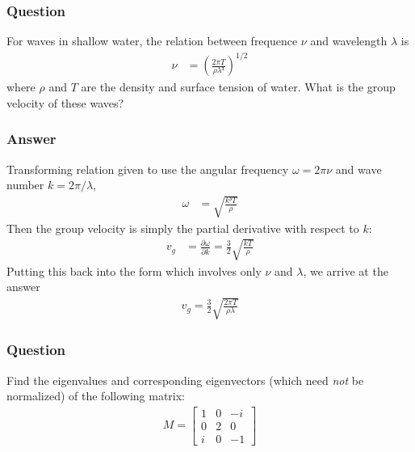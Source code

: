 \subsubsection{Question}

For waves in shallow water, the relation between frequence $ν$ and wavelength
$λ$ is
\begin{align*}
    ν &= (\frac{2πT}{ρλ³})^{1/2}
\end{align*}
where $ρ$ and $T$ are the density and surface tension of water. What is the
group velocity of these waves?

\subsubsection{Answer}

Transforming relation given to use the angular frequency $ω = 2πν$ and
wave number $k = 2π/λ$,
\begin{align*}
    ω &= \sqrt{ \frac{k³T}{ρ} }
\end{align*}
Then the group velocity is simply the partial derivative with respect to $k$:
\begin{align*}
    v_g &= \frac{∂ω}{∂k} = \frac 32 \sqrt{\frac{kT}{ρ}}
\end{align*}
Putting this back into the form which involves only $ν$ and $λ$, we arrive at
the answer
\begin{align}
    \boxed{ v_g = \frac 32 \sqrt{\frac{2πT}{ρλ}} }
\end{align}

\subsubsection{Question}

Find the eigenvalues and corresponding eigenvectors (which need \emph{not} be
normalized) of the following matrix:
\begin{align*}
    M = \begin{bmatrix}
	1 & 0 & -i \\
	0 & 2 & 0 \\
	i & 0 & -1
    \end{bmatrix}
\end{align*}


